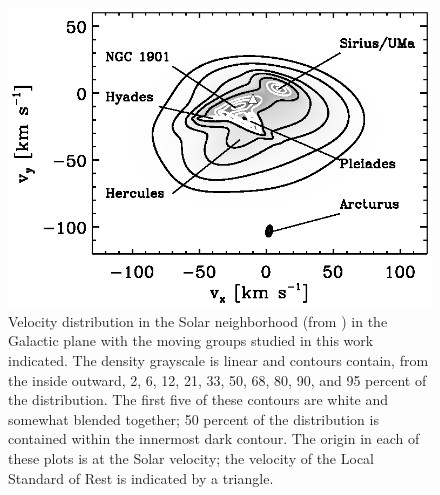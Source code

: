 \clearpage
\begin{figure}
\includegraphics{figs_groups/veldist.eps}
\caption[Velocity distribution in the Solar neighborhood (from
  \citealt{Bovyveldist}) in the Galactic plane with the moving groups
  studied in chapter BOVY: CHAPTER indicated]{Velocity distribution in
  the Solar neighborhood (from \citealt{Bovyveldist}) in the Galactic
  plane with the moving groups studied in this work indicated. The
  density grayscale is linear and contours contain, from the inside
  outward, 2, 6, 12, 21, 33, 50, 68, 80, 90, and 95 percent of the
  distribution. The first five of these contours are white and
  somewhat blended together; 50 percent of the distribution is
  contained within the innermost dark contour. The origin in each of
  these plots is at the Solar velocity; the velocity of the Local
  Standard of Rest \citep{2005ApJ...629..268H} is indicated by a
  triangle.}\label{fig:veldist}
\end{figure}

